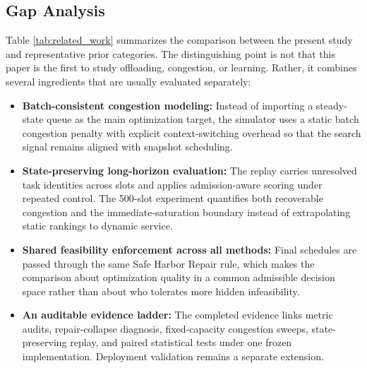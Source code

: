 \documentclass[pdflatex,sn-mathphys-num]{sn-jnl}
\begin{document}
\subsection{Gap Analysis}
Table \ref{tab:related_work} summarizes the comparison between the present study and representative prior categories. The distinguishing point is not that this paper is the first to study offloading, congestion, or learning. Rather, it combines several ingredients that are usually evaluated separately:
\begin{itemize}
    \item \textbf{Batch-consistent congestion modeling:} Instead of importing a steady-state queue as the main optimization target, the simulator uses a static batch congestion penalty with explicit context-switching overhead so that the search signal remains aligned with snapshot scheduling.
    \item \textbf{State-preserving long-horizon evaluation:} The replay carries unresolved task identities across slots and applies admission-aware scoring under repeated control. The 500-slot experiment quantifies both recoverable congestion and the immediate-saturation boundary instead of extrapolating static rankings to dynamic service.
    \item \textbf{Shared feasibility enforcement across all methods:} Final schedules are passed through the same Safe Harbor Repair rule, which makes the comparison about optimization quality in a common admissible decision space rather than about who tolerates more hidden infeasibility.
    \item \textbf{An auditable evidence ladder:} The completed evidence links metric audits, repair-collapse diagnosis, fixed-capacity congestion sweeps, state-preserving replay, and paired statistical tests under one frozen implementation. Deployment validation remains a separate extension.
\end{itemize}
\end{document}
